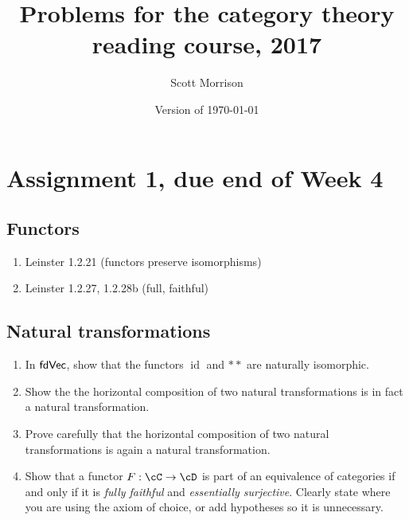 \documentclass[12pt]{amsart}
\begin{document}
\title{Problems for the category theory reading course, 2017}
\author{Scott Morrison}
  \address[Scott Morrison]{
  	Mathematical Sciences Institute,
  	Australian National University
  }
\date{Version of \today}

\maketitle

\section{Assignment 1, due end of Week 4}

\subsection{Functors}
\begin{enumerate}
\item Leinster 1.2.21 (functors preserve isomorphisms)
\item Leinster 1.2.27, 1.2.28b (full, faithful)
\end{enumerate}

\subsection{Natural transformations}
\begin{enumerate}
\item In $\sf{fdVec}$, show that the functors $\operatorname{id}$ and $**$ are naturally isomorphic. 
\item Show the the horizontal composition of two natural transformations is in fact a natural transformation.
\item Prove carefully that the horizontal composition of two natural transformations is again a natural transformation.
\item Show that a functor $F : \cC \to \cD$ is part of an equivalence of categories if and only if it is \emph{fully faithful} and \emph{essentially surjective}. Clearly state where you are using the axiom of choice, or add hypotheses so it is unnecessary.
\end{enumerate}
\end{document}
